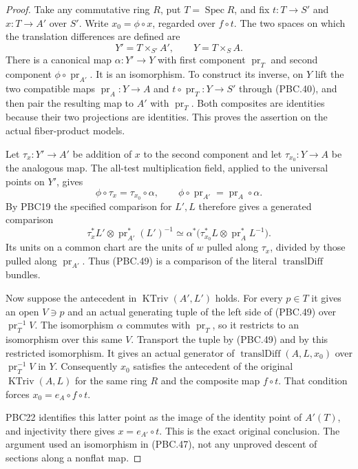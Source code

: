 \documentclass[11pt,a4paper]{article}
\numberwithin{equation}{section}
\theoremstyle{remark}\newtheorem{remark}[theorem]{Remark}
\begin{document}
\begin{proof}
Take any commutative ring $R$, put $T=\operatorname{Spec}R$,
and fix $t:T\to S'$ and $x:T\to A'$ over $S'$.
Write $x_0=\phi\circ x$, regarded over $f\circ t$.
The two spaces on which the translation differences are defined are
\[
 Y'=T\times_{S'}A',\qquad Y=T\times_S A.
                                                        \tag{PBC.47}
\]
There is a canonical map
$\alpha:Y'\to Y$ with first component $\operatorname{pr}_T$
and second component $\phi\circ\operatorname{pr}_{A'}$.
It is an isomorphism.  To construct its inverse, on $Y$ lift
the two compatible maps
$\operatorname{pr}_A:Y\to A$ and
$t\circ\operatorname{pr}_T:Y\to S'$ through (PBC.40), and
then pair the resulting map to $A'$ with $\operatorname{pr}_T$.
Both composites are identities because their two projections
are identities.  This proves the assertion on the actual
fiber-product models.

Let $\tau_x:Y'\to A'$ be addition of $x$ to the second
component and let $\tau_{x_0}:Y\to A$ be the analogous map.
The all-test multiplication field, applied to the universal
points on $Y'$, gives
\[
 \phi\circ\tau_x=\tau_{x_0}\circ\alpha,\qquad
 \phi\circ\operatorname{pr}_{A'}
                         =\operatorname{pr}_A\circ\alpha .
                                                        \tag{PBC.48}
\]
By PBC19 the specified comparison for $L',L$ therefore
gives a generated comparison
\[
 \tau_x^*L'\otimes\operatorname{pr}_{A'}^*(L')^{-1}
 \simeq
 \alpha^*\bigl(
    \tau_{x_0}^*L\otimes\operatorname{pr}_A^*L^{-1}\bigr).
                                                        \tag{PBC.49}
\]
Its units on a common chart are the units of $w$ pulled
along $\tau_x$, divided by those pulled along
$\operatorname{pr}_{A'}$.  Thus (PBC.49) is a comparison
of the literal $\operatorname{translDiff}$ bundles.

Now suppose the antecedent in $\operatorname{KTriv}(A',L')$
holds.  For every $p\in T$ it gives an open $V\ni p$ and
an actual generating tuple of the left side of (PBC.49)
over $\operatorname{pr}_T^{-1}V$.
The isomorphism $\alpha$ commutes with $\operatorname{pr}_T$,
so it restricts to an isomorphism over this same $V$.
Transport the tuple by (PBC.49) and by this restricted
isomorphism.  It gives an actual generator of
$\operatorname{translDiff}(A,L,x_0)$ over
$\operatorname{pr}_T^{-1}V$ in $Y$.
Consequently $x_0$ satisfies the antecedent of the
original $\operatorname{KTriv}(A,L)$ for the same ring
$R$ and the composite map $f\circ t$.
That condition forces $x_0=e_A\circ f\circ t$.

PBC22 identifies this latter point as the image of the
identity point of $A'(T)$, and injectivity there gives
$x=e_{A'}\circ t$.  This is the exact original conclusion.
The argument used an isomorphism in (PBC.47), not any
unproved descent of sections along a nonflat map.
\end{proof}
\end{document}
